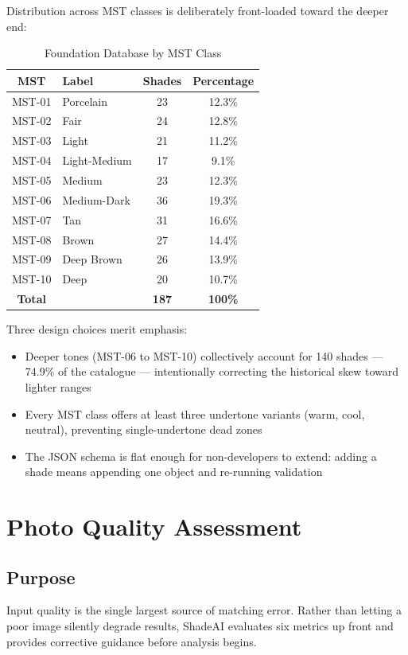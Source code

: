 Distribution across MST classes is deliberately front-loaded toward the deeper end:

\begin{table}[h]
\centering
\begin{tabular}{|c|l|c|c|}
\hline
\textbf{MST} & \textbf{Label} & \textbf{Shades} & \textbf{Percentage} \\
\hline
MST-01 & Porcelain & 23 & 12.3\% \\
MST-02 & Fair & 24 & 12.8\% \\
MST-03 & Light & 21 & 11.2\% \\
MST-04 & Light-Medium & 17 & 9.1\% \\
MST-05 & Medium & 23 & 12.3\% \\
MST-06 & Medium-Dark & 36 & 19.3\% \\
MST-07 & Tan & 31 & 16.6\% \\
MST-08 & Brown & 27 & 14.4\% \\
MST-09 & Deep Brown & 26 & 13.9\% \\
MST-10 & Deep & 20 & 10.7\% \\
\hline
\textbf{Total} & & \textbf{187} & \textbf{100\%} \\
\hline
\end{tabular}
\caption{Foundation Database by MST Class}
\end{table}

Three design choices merit emphasis:
\begin{itemize}
    \item Deeper tones (MST-06 to MST-10) collectively account for 140 shades — 74.9\% of the catalogue — intentionally correcting the historical skew toward lighter ranges
    \item Every MST class offers at least three undertone variants (warm, cool, neutral), preventing single-undertone dead zones
    \item The JSON schema is flat enough for non-developers to extend: adding a shade means appending one object and re-running validation
\end{itemize}

\section{Photo Quality Assessment}

\subsection{Purpose}
Input quality is the single largest source of matching error. Rather than letting a poor image silently degrade results, ShadeAI evaluates six metrics up front and provides corrective guidance before analysis begins.


